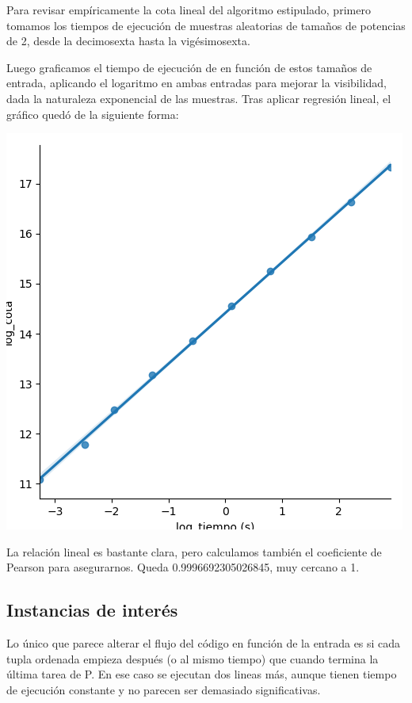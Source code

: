 \vspace{0.5em}
Para revisar empíricamente la cota lineal del algoritmo estipulado, primero tomamos los tiempos de ejecución de muestras aleatorias de tamaños de potencias de 2, desde la decimosexta hasta la vigésimosexta.

Luego graficamos el tiempo de ejecución de en función de estos tamaños de entrada, aplicando el logaritmo en ambas entradas para mejorar la visibilidad, dada la naturaleza exponencial de las muestras. Tras aplicar regresión lineal, el gráfico quedó de la siguiente forma:

\includegraphics{files/src/.media/Grafico_aleatorios.png}

La relación lineal es bastante clara, pero calculamos también el coeficiente de Pearson para asegurarnos. Queda 0.9996692305026845, muy cercano a 1.

\vspace{0.5em}
\subsection{Instancias de interés}

Lo único que parece alterar el flujo del código en función de la entrada es si cada tupla ordenada empieza después (o al mismo tiempo) que cuando termina la última tarea de P. En ese caso se ejecutan dos lineas más, aunque tienen tiempo de ejecución constante y no parecen ser demasiado significativas.

